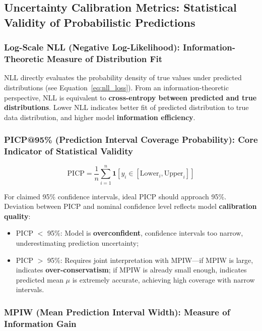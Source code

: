 \documentclass[10pt]{article}
\begin{document}
\subsection{Uncertainty Calibration Metrics: Statistical Validity of Probabilistic Predictions}

\subsubsection{Log-Scale NLL (Negative Log-Likelihood): Information-Theoretic Measure of Distribution Fit}

NLL directly evaluates the probability density of true values under predicted distributions (see Equation~\ref{eq:nll_loss}). From an information-theoretic perspective, NLL is equivalent to \textbf{cross-entropy between predicted and true distributions}. Lower NLL indicates better fit of predicted distribution to true data distribution, and higher model \textbf{information efficiency}.

\subsubsection{PICP@95\% (Prediction Interval Coverage Probability): Core Indicator of Statistical Validity}

\begin{equation}
\text{PICP} = \frac{1}{n}\sum_{i=1}^{n}\mathbf{1}[y_i \in [\text{Lower}_i, \text{Upper}_i]]
\end{equation}

For claimed 95\% confidence intervals, ideal PICP should approach 95\%. Deviation between PICP and nominal confidence level reflects model \textbf{calibration quality}:
\begin{itemize}[leftmargin=*]
    \item PICP $<$ 95\%: Model is \textbf{overconfident}, confidence intervals too narrow, underestimating prediction uncertainty;
    \item PICP $>$ 95\%: Requires joint interpretation with MPIW---if MPIW is large, indicates \textbf{over-conservatism}; if MPIW is already small enough, indicates predicted mean $\mu$ is extremely accurate, achieving high coverage with narrow intervals.
\end{itemize}

\subsubsection{MPIW (Mean Prediction Interval Width): Measure of Information Gain}
\end{document}

